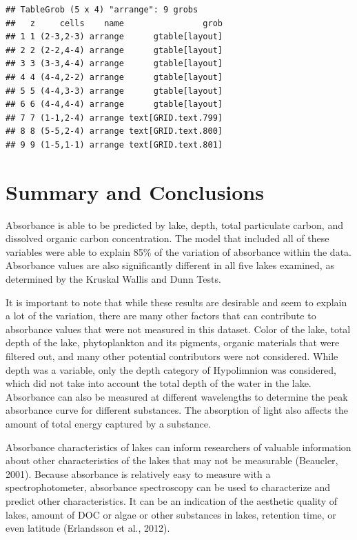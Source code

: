 \documentclass[12pt,]{article}
\begin{document}
\begin{verbatim}
## TableGrob (5 x 4) "arrange": 9 grobs
##   z     cells    name                grob
## 1 1 (2-3,2-3) arrange      gtable[layout]
## 2 2 (2-2,4-4) arrange      gtable[layout]
## 3 3 (3-3,4-4) arrange      gtable[layout]
## 4 4 (4-4,2-2) arrange      gtable[layout]
## 5 5 (4-4,3-3) arrange      gtable[layout]
## 6 6 (4-4,4-4) arrange      gtable[layout]
## 7 7 (1-1,2-4) arrange text[GRID.text.799]
## 8 8 (5-5,2-4) arrange text[GRID.text.800]
## 9 9 (1-5,1-1) arrange text[GRID.text.801]
\end{verbatim}

\newpage

\section{Summary and Conclusions}\label{summary-and-conclusions}

Absorbance is able to be predicted by lake, depth, total particulate
carbon, and dissolved organic carbon concentration. The model that
included all of these variables were able to explain 85\% of the
variation of absorbance within the data. Absorbance values are also
significantly different in all five lakes examined, as determined by the
Kruskal Wallis and Dunn Tests.

It is important to note that while these results are desirable and seem
to explain a lot of the variation, there are many other factors that can
contribute to absorbance values that were not measured in this dataset.
Color of the lake, total depth of the lake, phytoplankton and its
pigments, organic materials that were filtered out, and many other
potential contributors were not considered. While depth was a variable,
only the depth category of Hypolimnion was considered, which did not
take into account the total depth of the water in the lake. Absorbance
can also be measured at different wavelengths to determine the peak
absorbance curve for different substances. The absorption of light also
affects the amount of total energy captured by a substance.

Absorbance characteristics of lakes can inform researchers of valuable
information about other characteristics of the lakes that may not be
measurable (Beaucler, 2001). Because absorbance is relatively easy to
measure with a spectrophotometer, absorbance spectroscopy can be used to
characterize and predict other characteristics. It can be an indication
of the aesthetic quality of lakes, amount of DOC or algae or other
substances in lakes, retention time, or even latitude (Erlandsson et
al., 2012).
\end{document}
